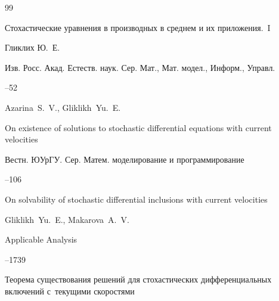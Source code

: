 \begin{thebibliography}{99}




\paper Стохастические уравнения в производных в среднем и их приложения.~I

\by Гликлих Ю.~Е.

\jour Изв. Росс. Акад. Естеств. наук. Сер. Мат., Мат. модел., Информ., Управл.




--52





\by Azarina~S.~V., Gliklikh~Yu.~E.

\paper On existence of solutions to stochastic differential equations with current velocities

\jour Вестн. ЮУрГУ. Сер. Матем. моделирование и программирование




--106







\paper On solvability of stochastic differential inclusions with current velocities

\by Gliklikh~Yu.~E., Makarova~A.~V.

\jour Applicable Analysis




--1739





\paper Теорема существования решений для стохастических дифференциальных включений с~текущими скоростями


\end{thebibliography}
